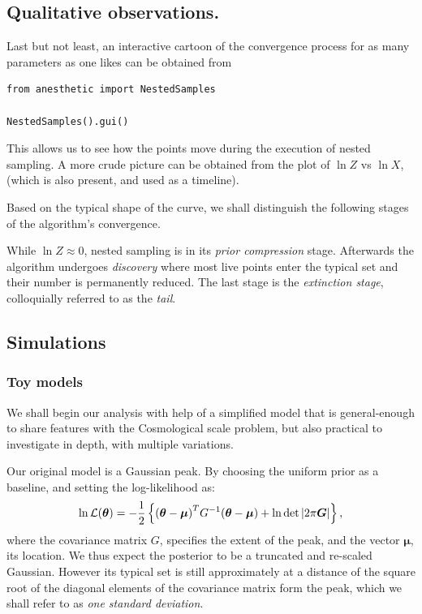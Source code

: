 \documentclass[usenatbib]{mnras}
\begin{document}
\subsection{Qualitative observations.}\label{sec:org8582714}
Last but not least, an interactive cartoon of the convergence
process for as many parameters as one likes can be obtained from

\lstset{language=Python,label= ,caption= ,captionpos=b,numbers=none}
\begin{lstlisting}
from anesthetic import NestedSamples

NestedSamples().gui()
\end{lstlisting}
This allows us to see how the points move during the execution of
nested sampling. A more crude picture can be obtained from the plot
of \(\ln Z\) vs \(\ln X\), (which is also present, and used as a
timeline).

Based on the typical shape of the curve, we shall distinguish the
following stages of the algorithm's convergence.

While \(\ln Z \approx 0\), nested sampling is in its \emph{prior
compression} stage.  Afterwards the algorithm undergoes \emph{discovery}
where most live points enter the typical set and their number is
permanently reduced. The last stage is the \emph{extinction stage},
colloquially referred to as the \emph{tail}.


\subsection{Simulations}\label{sec:org3c21ce7}
\subsubsection{Toy models}\label{sec:orgadf0bbd}

We shall begin our analysis with help of a simplified model that is
general-enough to share features with the Cosmological scale problem,
but also practical to investigate in depth, with multiple variations.

Our original model is a Gaussian peak. By choosing the uniform prior
as a baseline, and setting the log-likelihood as:
\begin{equation*}
  \ln {\cal L}(\bm{\theta}) = - \dfrac{1}{2} \left\{{(\bm{\theta} - \bm{\mu})}^{T}G^{-1}(\bm{\theta}-\bm{\mu})  + \ln \det \left| 2\mathrm{\pi} \bm{G}\right| \right\},
\end{equation*}
where the covariance matrix \(G\), specifies the extent of the peak,
and the vector \(\bm{\mu}\), its location. We thus expect the
posterior to be a truncated and re-scaled Gaussian. However its
typical set is still approximately at a distance of the square root of
the diagonal elements of the covariance matrix form the peak, which we
shall refer to as \emph{one standard deviation}.
\end{document}
